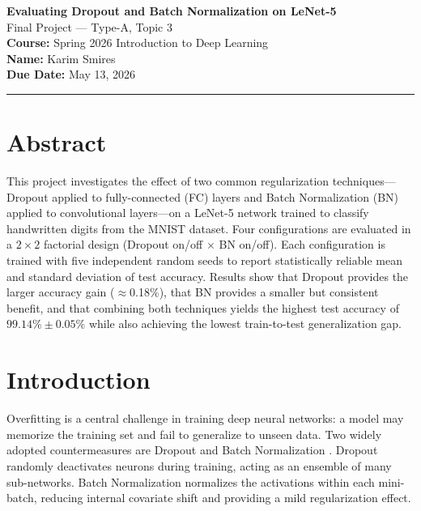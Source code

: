 \documentclass[11pt]{article}
\begin{document}
\begin{center}
  {\Large \textbf{Evaluating Dropout and Batch Normalization on LeNet-5}} \\
  \vspace{0.2cm}
  {\large Final Project --- Type-A, Topic 3} \\
  \vspace{0.2cm}
  \textbf{Course:} Spring 2026 Introduction to Deep Learning \\
  \textbf{Name:} Karim Smires \\
  \textbf{Due Date:} May 13, 2026
\end{center}
\hrule
\vspace{0.5cm}

\section*{Abstract}
This project investigates the effect of two common regularization techniques---Dropout
applied to fully-connected (FC) layers and Batch Normalization (BN) applied to
convolutional layers---on a LeNet-5 network trained to classify handwritten digits
from the MNIST dataset. Four configurations are evaluated in a $2\times 2$ factorial
design (Dropout on/off $\times$ BN on/off). Each configuration is trained with five
independent random seeds to report statistically reliable mean and standard deviation
of test accuracy. Results show that Dropout provides the larger accuracy gain
($\approx$0.18\%), that BN provides a smaller but consistent benefit, and that combining
both techniques yields the highest test accuracy of $99.14\% \pm 0.05\%$ while also
achieving the lowest train-to-test generalization gap.

\section{Introduction}
Overfitting is a central challenge in training deep neural networks: a model may memorize
the training set and fail to generalize to unseen data. Two widely adopted countermeasures
are Dropout \cite{srivastava2014dropout} and Batch Normalization \cite{ioffe2015batch}.
Dropout randomly deactivates neurons during training, acting as an ensemble of many
sub-networks. Batch Normalization normalizes the activations within each mini-batch,
reducing internal covariate shift and providing a mild regularization effect.
\end{document}
